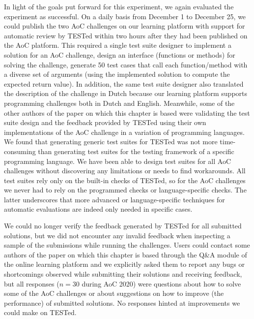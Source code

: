 \documentclass[../main]{subfiles}
\begin{document}
In light of the goals put forward for this experiment, we again evaluated the experiment as successful.
On a daily basis from December 1 to December 25, we could publish the two AoC challenges on our learning platform with support for automatic review by TESTed within two hours after they had been published on the AoC platform.
This required a single test suite designer to implement a solution for an AoC challenge, design an interface (functions or methods) for solving the challenge, generate 50 test cases that call each function/method with a diverse set of arguments (using the implemented solution to compute the expected return value).
In addition, the same test suite designer also translated the description of the challenge in Dutch because our learning platform supports programming challenges both in Dutch and English.
Meanwhile, some of the other authors of the paper on which this chapter is based were validating the test suite design and the feedback provided by TESTed using their own implementations of the AoC challenge in a variation of programming languages.
We found that generating generic test suites for TESTed was not more time-consuming than generating test suites for the testing framework of a specific programming language.
We have been able to design test suites for all AoC challenges without discovering any limitations or needs to find workarounds.
All test suites rely only on the built-in checks of TESTed, so for the AoC challenges we never had to rely on the programmed checks or language-specific checks.
The latter underscores that more advanced or language-specific techniques for automatic evaluations are indeed only needed in specific cases.

We could no longer verify the feedback generated by TESTed for all submitted solutions, but we did not encounter any invalid feedback when inspecting a sample of the submissions while running the challenges.
Users could contact some authors of the paper on which this chapter is based through the Q\&A module of the online learning platform and we explicitly asked them to report any bugs or shortcomings observed while submitting their solutions and receiving feedback, but all responses ($n=30$ during AoC 2020) were questions about how to solve some of the AoC challenges or about suggestions on how to improve (the performance) of submitted solutions.
No responses hinted at improvements we could make on TESTed.
\end{document}
